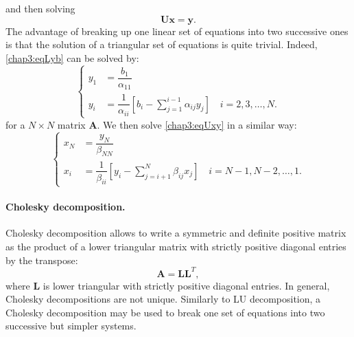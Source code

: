 and then solving 
\begin{equation}
\label{chap3:eqUxy}
\mathbf{U} \mathbf{x} = \mathbf{y}.
\end{equation}
The advantage of breaking up one linear set of equations into two successive ones is that the solution of a triangular set of equations is quite trivial. Indeed, \eqref{chap3:eqLyb} can be solved by:
\begin{equation} 
\left\lbrace
	\begin{aligned}
		y_1 &= \dfrac{b_1}{\alpha_{11}}  \\	
		y_i &= \dfrac{1}{\alpha_{ii}} \left[ b_i - \sum_{j=1}^{i-1} \alpha_{ij} y_j \right] \quad i = 2, 3, \ldots, N.
	\end{aligned} 
\right.
\end{equation}
for a $ N \times N $ matrix $ \mathbf{A} $. We then solve \eqref{chap3:eqUxy} in a similar way:
\begin{equation} 
\left\lbrace
	\begin{aligned}
		x_N &= \dfrac{y_N}{\beta_{NN}} \\	
		x_i &= \dfrac{1}{\beta_{ii}} \left[ y_i - \sum_{j=i+1}^{N} \beta_{ij} x_j \right] \quad i = N-1, N-2, \ldots, 1. 
	\end{aligned} 
\right.
\end{equation}

\ON
\paragraph*{Cholesky decomposition.}	\label{chap3:CholeskyDecompo}
Cholesky decomposition allows to write a symmetric and definite positive matrix as the product of a lower triangular matrix with strictly positive diagonal entries by the transpose: 
\begin{equation}
\label{chap3:Cholesky}
\mathbf{A} = \mathbf{L} \mathbf{L}^T,
\end{equation}
where $ \mathbf{L} $ is lower triangular with strictly positive diagonal entries. In general, Cholesky decompositions are not unique. Similarly to LU decomposition, a Cholesky decomposition may be used to break one set of equations into two successive but simpler systems. 
\OFF

